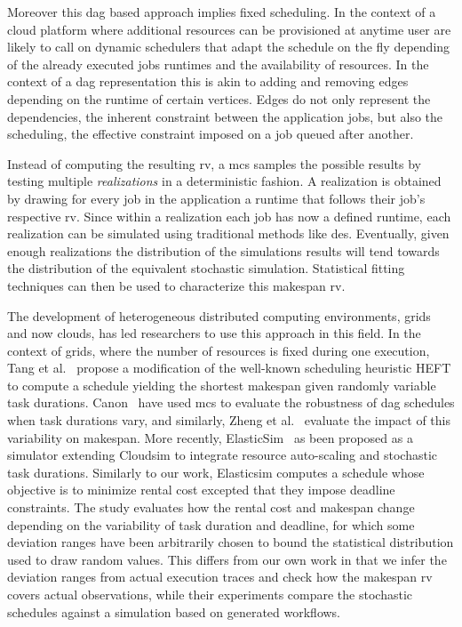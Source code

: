 \documentclass[10pt,conference,compsocconf]{IEEEtran}
\begin{document}
Moreover this \ac{dag} based approach implies fixed scheduling. In the context
of a cloud platform where additional resources can be provisioned at anytime
user are likely to call on dynamic schedulers that adapt the schedule on the fly
depending of the already executed jobs runtimes and the availability of
resources. In the context of a \ac{dag} representation this is akin to adding
and removing edges depending on the runtime of certain vertices. Edges do not
only represent the dependencies, the inherent constraint between the application
jobs, but also the scheduling, the effective constraint imposed on a job queued
after another.


Instead  of computing  the resulting  \ac{rv}, a  \ac{mcs} samples  the possible
results by testing  multiple \emph{realizations} in a  deterministic fashion.  A
realization is  obtained by drawing for  every job in the  application a runtime
that follows their job's respective \ac{rv}. Since within a realization each job
has now a  defined runtime, each realization can be  simulated using traditional
methods like \ac{des}.  Eventually, given enough realizations the distribution of
the simulations  results will  tend towards the  distribution of  the equivalent
stochastic  simulation.  Statistical  fitting  techniques can  then  be used  to
characterize this makespan \ac{rv}.

The development  of heterogeneous distributed computing  environments, grids and
now clouds,  has led  researchers to  use this  approach in  this field.  In the
context of grids,  where the number of resources is  fixed during one execution,
Tang et  al.~\cite{Tang11} propose a  modification of the  well-known scheduling
heuristic  HEFT to  compute  a  schedule yielding  the  shortest makespan  given
randomly  variable task  durations. Canon~\cite{Canon10}  have used  \ac{mcs} to
evaluate  the robustness  of \ac{dag}  schedules when  task durations  vary, and
similarly, Zheng et  al.~\cite{Zheng13} evaluate the impact  of this variability
on  makespan.  More  recently,  ElasticSim~\cite{Cai17} as  been  proposed as  a
simulator extending  Cloudsim to integrate resource  auto-scaling and stochastic
task  durations. Similarly  to our  work, Elasticsim  computes a  schedule whose
objective  is  to  minimize  rental  cost excepted  that  they  impose  deadline
constraints.  The  study evaluates  how  the  rental  cost and  makespan  change
depending  on the  variability of  task duration  and deadline,  for which  some
deviation  ranges  have  been  arbitrarily   chosen  to  bound  the  statistical
distribution used to draw random values. This  differs from our own work in that
we infer  the deviation ranges  from actual execution  traces and check  how the
makespan \ac{rv} covers actual observations, while their experiments compare the
stochastic schedules against a simulation based on generated workflows.
\end{document}
